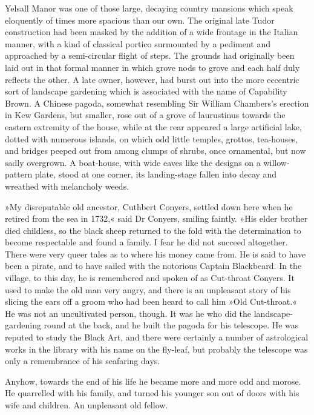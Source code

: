 Yelsall Manor was one of those large, decaying country mansions which speak eloquently of times more spacious than our own. The original late Tudor construction had been masked by the addition of a wide frontage in the Italian manner, with a kind of classical portico surmounted by a pediment and approached by a semi-circular flight of steps. The grounds had originally been laid out in that formal manner in which grove nods to grove and each half duly reflects the other. A late owner, however, had burst out into the more eccentric sort of landscape gardening which is associated with the name of Capability Brown. A Chinese pagoda, somewhat resembling Sir William Chambers's erection in Kew Gardens, but smaller, rose out of a grove of laurustinus towards the eastern extremity of the house, while at the rear appeared a large artificial lake, dotted with numerous islands, on which odd little temples, grottos, tea-houses, and bridges peeped out from among clumps of shrubs, once ornamental, but now sadly overgrown. A boat-house, with wide eaves like the designs on a willow-pattern plate, stood at one corner, its landing-stage fallen into decay and wreathed with melancholy weeds.

»My disreputable old ancestor, Cuthbert Conyers, settled down here when he retired from the sea in 1732,« said Dr Conyers, smiling faintly. »His elder brother died childless, so the black sheep returned to the fold with the determination to become respectable and found a family. I fear he did not succeed altogether. There were very queer tales as to where his money came from. He is said to have been a pirate, and to have sailed with the notorious Captain Blackbeard. In the village, to this day, he is remembered and spoken of as Cut-throat Conyers. It used to make the old man very angry, and there is an unpleasant story of his slicing the ears off a groom who had been heard to call him »Old Cut-throat.« He was not an uncultivated person, though. It was he who did the landscape-gardening round at the back, and he built the pagoda for his telescope. He was reputed to study the Black Art, and there were certainly a number of astrological works in the library with his name on the fly-leaf, but probably the telescope was only a remembrance of his seafaring days.

Anyhow, towards the end of his life he became more and more odd and morose. He quarrelled with his family, and turned his younger son out of doors with his wife and children. An unpleasant old fellow.

